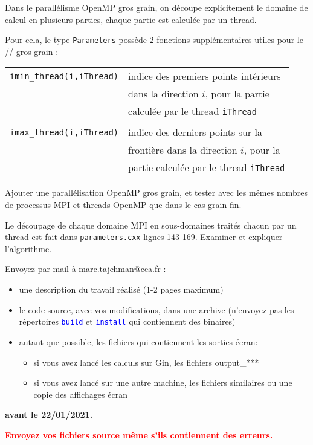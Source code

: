 \documentclass{beamer}
\begin{document}
\begin{frame}
	Dans le parallélisme OpenMP gros grain, on découpe explicitement le domaine de calcul en plusieurs parties, chaque partie est calculée par un thread.
	\vfill
	
	Pour cela, le type {\tt Parameters} possède 2 fonctions supplémentaires utiles pour le // gros grain :
	\bigskip
	
	\begin{tabular}{ll}
		{\tt imin\_thread(i,iThread)}&indice des premiers points intérieurs \\ &  dans la direction $i$, pour la partie \\ 
		&calculée par le thread {\tt iThread}\\ \\
		{\tt imax\_thread(i,iThread)}& indice des derniers points sur la \\
		& frontière dans la direction $i$, pour la \\
		& partie calculée par le thread {\tt iThread}
	\end{tabular}
	
\end{frame}

\begin{frame}

Ajouter une parallélisation OpenMP gros grain, et tester avec les mêmes nombres de processus MPI et threads OpenMP que dans le cas grain fin.
\bigskip

Le découpage de chaque domaine MPI en sous-domaines traités chacun par un thread est fait dans \texttt{parameters.cxx} lignes 143-169. Examiner et expliquer l'algorithme.


	
\end{frame}

\begin{frame}
\bigskip
Envoyez par mail à \href{mailto:marc.tajchman@cea.fr}{marc.tajchman@cea.fr} :

\begin{itemize}
	\item une description du travail réalisé (1-2 pages maximum)
	\item le code source, avec vos modifications, dans une archive
	(n'envoyez pas les répertoires \textcolor{blue}{\tt build} et  \textcolor{blue}{\tt install} qui contiennent des binaires) 
	\item autant que possible, les fichiers qui contiennent les sorties écran:
	\begin{itemize}
		\item si vous avez lancé les calculs sur Gin, les fichiers output\_***
	    \item si vous avez lancé sur une autre machine, les fichiers similaires ou une copie des affichages  écran
	\end{itemize}
\end{itemize}

\bigskip

{\bf avant le 22/01/2021.}

\bigskip
\textcolor{red}{\bf Envoyez vos fichiers source même s'ils contiennent des erreurs.}
\end{frame}
\end{document}
